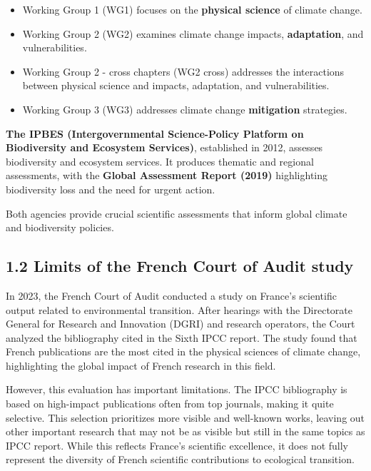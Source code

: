 \documentclass[
]{article}
\providecommand{\tightlist}{%
  \setlength{\itemsep}{0pt}\setlength{\parskip}{0pt}}
\begin{document}
\begin{itemize}
\tightlist
\item
  Working Group 1 (WG1) focuses on the \textbf{physical science} of
  climate change.
\item
  Working Group 2 (WG2) examines climate change impacts,
  \textbf{adaptation}, and vulnerabilities.
\item
  Working Group 2 - cross chapters (WG2 cross) addresses the
  interactions between physical science and impacts, adaptation, and
  vulnerabilities.
\item
  Working Group 3 (WG3) addresses climate change \textbf{mitigation}
  strategies.
\end{itemize}

\textbf{The IPBES (Intergovernmental Science-Policy Platform on
Biodiversity and Ecosystem Services)}, established in 2012, assesses
biodiversity and ecosystem services. It produces thematic and regional
assessments, with the \textbf{Global Assessment Report (2019)}
highlighting biodiversity loss and the need for urgent action.

Both agencies provide crucial scientific assessments that inform global
climate and biodiversity policies.

\hypertarget{limits-of-the-french-court-of-audit-study}{%
\subsection{1.2 Limits of the French Court of Audit
study}\label{limits-of-the-french-court-of-audit-study}}

In 2023, the French Court of Audit conducted a study on France's
scientific output related to environmental transition. After hearings
with the Directorate General for Research and Innovation (DGRI) and
research operators, the Court analyzed the bibliography cited in the
Sixth IPCC report. The study found that French publications are the most
cited in the physical sciences of climate change, highlighting the
global impact of French research in this field.

However, this evaluation has important limitations. The IPCC
bibliography is based on high-impact publications often from top
journals, making it quite selective. This selection prioritizes more
visible and well-known works, leaving out other important research that
may not be as visible but still in the same topics as IPCC report. While
this reflects France's scientific excellence, it does not fully
represent the diversity of French scientific contributions to ecological
transition.
\end{document}
